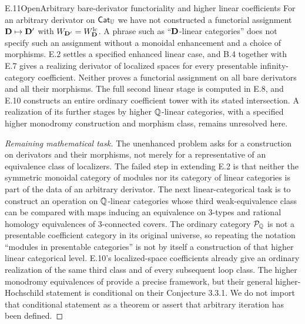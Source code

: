 \begin{claim}{E.11}{Open}{Arbitrary bare-derivator functoriality and higher linear coefficients}
For an arbitrary derivator on $\mathsf{Cat}_\mathbb U$ we have not constructed a
functorial assignment $\mathbf D\mapsto\mathbf D'$ with
$W_{\mathbf D'}=W_\mathbf D^{\mathrm{lc}}$.  A phrase such as ``$\mathbf D$-linear
categories'' does not specify such an assignment without a monoidal
enhancement and a choice of morphisms.  E.2 settles a specified
enhanced linear case, and B.4 together with E.7 gives a realizing
derivator of localized spaces for every presentable
infinity-category coefficient. Neither proves a functorial
assignment on all bare derivators and all their morphisms.
The full second linear stage is computed in E.8, and E.10 constructs
an entire ordinary coefficient tower with its stated intersection.
A realization of its further stages by higher $\mathbb Q$-linear
categories, with a specified higher monodromy construction and
morphism class, remains unresolved here.
\end{claim}
\begin{proof}[Remaining mathematical task]
The unenhanced problem asks for a construction on derivators and their
morphisms, not merely for a representative of an equivalence class of
localizers.  The failed step in extending E.2 is that neither the
symmetric monoidal category of modules nor its category of linear
categories is part of the data of an arbitrary derivator.
The next linear-categorical task is to construct an operation on
$\mathbb Q$-linear categories whose third weak-equivalence class can be compared with maps
inducing an equivalence on 3-types and rational homology
equivalences of 3-connected covers.  The ordinary category
$\mathcal P_\mathbb Q$ is not a presentable coefficient category in
its original universe, so repeating the notation
``modules in presentable categories'' is not by itself a
construction of that higher linear categorical level. E.10's
localized-space coefficients already give an ordinary realization
of the same third class and of every subsequent loop class.
The higher monodromy
equivalences of \citet[Theorem 3.2.24]{EF_PPS2025} provide a precise
framework, but their general higher-Hochschild statement is conditional
on their Conjecture 3.3.1.  We do not import that conditional statement
as a theorem or assert that arbitrary iteration has been defined.
\end{proof}
